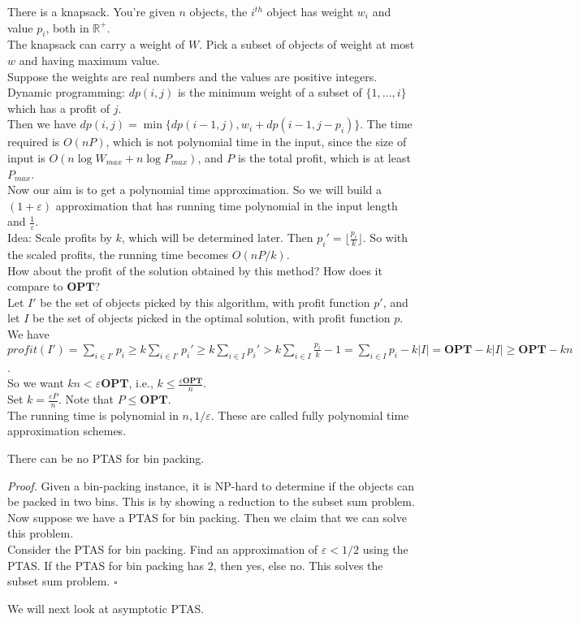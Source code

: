 \documentclass[a4paper]{article}
\newenvironment{proof}{\begin{breakbox}\textit{Proof.}}{\hfill$\square$\end{breakbox}}
\newcommand{\nl}{\vspace{0.2cm}\\}
\newcommand{\eps}{\varepsilon}
\newcommand{\R}{\mathbb{R}}
\newcommand{\OPT}{\mathbf{OPT}}
\begin{document}
There is a knapsack. You're given $n$ objects, the $i^{th}$ object has weight $w_i$ and value $p_i$, both in $\R^+$.\nl
The knapsack can carry a weight of $W$. Pick a subset of objects of weight at most $w$ and having maximum value.\nl
Suppose the weights are real numbers and the values are positive integers.\nl
Dynamic programming: $dp(i, j)$ is the minimum weight of a subset of $\{1, \ldots, i\}$ which has a profit of $j$.\nl
Then we have $dp(i, j) = \min \{dp(i - 1, j), w_i + dp(i - 1, j - p_i)\}$. The time required is $O(nP)$, which is not polynomial time in the input, since the size of input is $O(n \log W_{max} + n \log
P_{max})$, and $P$ is the total profit, which is at least $P_{max}$.\nl
Now our aim is to get a polynomial time approximation. So we will build a $(1 + \eps)$ approximation that has running time polynomial in the input length and $\frac{1}{\eps}$.\nl
Idea: Scale profits by $k$, which will be determined later. Then $p_i' = \lfloor \frac{p_i}{k} \rfloor$. So with the scaled profits, the running time becomes $O(n P/k)$.\nl
How about the profit of the solution obtained by this method? How does it compare to $\OPT$?\nl
Let $I'$ be the set of objects picked by this algorithm, with profit function $p'$, and let $I$ be the set of objects picked in the optimal solution, with profit function $p$.\nl
We have $profit(I') = \sum_{i \in I'} p_i \ge k \sum_{i \in I'} p_i' \ge k \sum_{i \in I} p_i' > k \sum_{i \in I} \frac{p_i}{k} - 1 = \sum_{i \in I} p_i - k |I| = \OPT - k|I| \ge \OPT - kn$.\nl
So we want $kn < \eps \OPT$, i.e., $k \le \frac{\eps \OPT}{n}$.\nl
Set $k = \frac{\eps P}{n}$. Note that $P \le \OPT$. \nl
The running time is polynomial in $n, 1/\eps$. These are called fully polynomial time approximation schemes.\nl
\begin{theorem}
    There can be no PTAS for bin packing.
\end{theorem}
\begin{proof}
    Given a bin-packing instance, it is NP-hard to determine if the objects can be packed in two bins. This is by showing a reduction to the subset sum problem.\nl
    Now suppose we have a PTAS for bin packing. Then we claim that we can solve this problem.\nl
    Consider the PTAS for bin packing. Find an approximation of $\eps < 1/2$ using the PTAS. If the PTAS for bin packing has $2$, then yes, else no. This solves the subset sum problem.
\end{proof}

We will next look at asymptotic PTAS.
\end{document}
